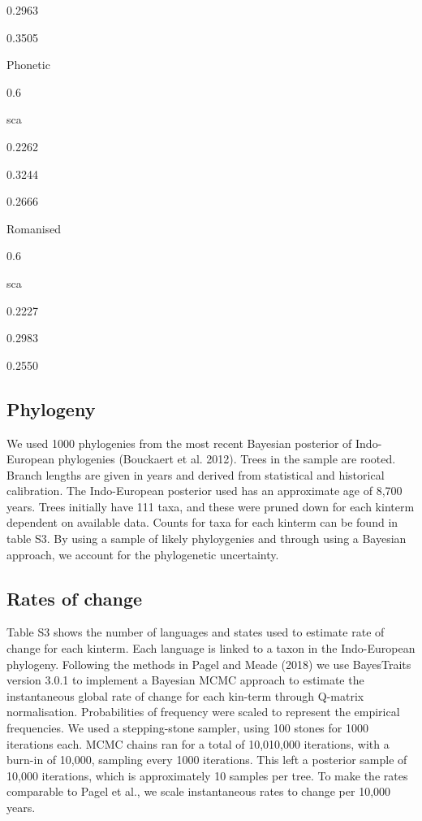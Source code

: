 \documentclass[]{article}
\begin{document}
0.2963

0.3505

Phonetic

0.6

sca

0.2262

0.3244

0.2666

Romanised

0.6

sca

0.2227

0.2983

0.2550

\hypertarget{phylogeny}{%
\subsection{Phylogeny}\label{phylogeny}}

We used 1000 phylogenies from the most recent Bayesian posterior of
Indo-European phylogenies (Bouckaert et al. 2012). Trees in the sample
are rooted. Branch lengths are given in years and derived from
statistical and historical calibration. The Indo-European posterior used
has an approximate age of 8,700 years. Trees initially have 111 taxa,
and these were pruned down for each kinterm dependent on available data.
Counts for taxa for each kinterm can be found in table S3. By using a
sample of likely phyloygenies and through using a Bayesian approach, we
account for the phylogenetic uncertainty.

\hypertarget{rates-of-change}{%
\subsection{Rates of change}\label{rates-of-change}}

Table S3 shows the number of languages and states used to estimate rate
of change for each kinterm. Each language is linked to a taxon in the
Indo-European phylogeny. Following the methods in Pagel and Meade (2018)
we use BayesTraits version 3.0.1 to implement a Bayesian MCMC approach
to estimate the instantaneous global rate of change for each kin-term
through Q-matrix normalisation. Probabilities of frequency were scaled
to represent the empirical frequencies. We used a stepping-stone
sampler, using 100 stones for 1000 iterations each. MCMC chains ran for
a total of 10,010,000 iterations, with a burn-in of 10,000, sampling
every 1000 iterations. This left a posterior sample of 10,000
iterations, which is approximately 10 samples per tree. To make the
rates comparable to Pagel et al., we scale instantaneous rates to change
per 10,000 years.
\end{document}
